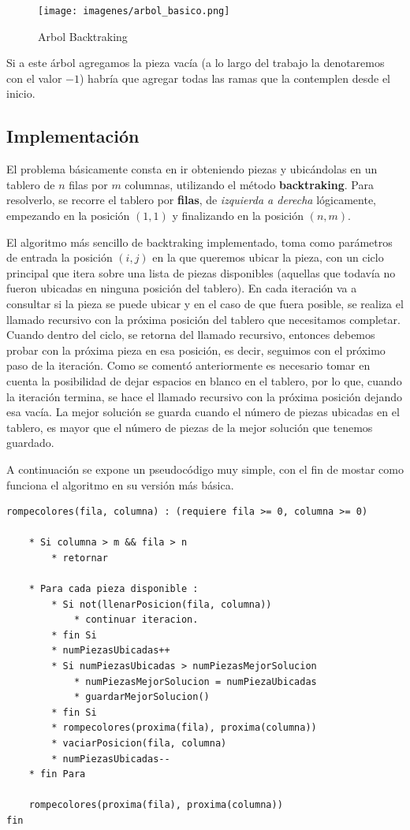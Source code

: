 \documentclass[11pt,a4paper]{article}
\begin{document}
	\begin{figure}[H]
    	\begin{center}
        	\texttt{[image: imagenes/arbol\_basico.png]}
    	\end{center}
    	\caption{Arbol Backtraking}
    	\label{fig:arbol_basico}
	\end{figure}

Si a este árbol agregamos la pieza vacía (a lo largo del trabajo la denotaremos con el valor $-1$) habría que agregar todas las ramas que la contemplen desde el inicio.

\subsection*{Implementación}

El problema básicamente consta en ir obteniendo piezas y ubicándolas en un tablero de $n$ filas por $m$ columnas, utilizando el método \textbf{backtraking}.
Para resolverlo, se recorre el tablero por \textbf{filas}, de \textit{izquierda a derecha} lógicamente, empezando en la posición $(1,1)$ y finalizando en la posición $(n,m)$.

El algoritmo más sencillo de backtraking implementado, toma como parámetros de entrada la posición $(i,j)$ en la que queremos ubicar la pieza, con un ciclo principal que itera sobre una lista de piezas disponibles (aquellas que todavía no fueron ubicadas en ninguna posición del tablero). En cada iteración va a consultar si la pieza se puede ubicar y en el caso de que fuera posible, se realiza el llamado recursivo con la próxima posición del tablero que necesitamos completar. Cuando dentro del ciclo, se retorna del llamado recursivo, entonces debemos probar con la próxima pieza en esa posición, es decir, seguimos con el próximo paso de la iteración.
Como se comentó anteriormente es necesario tomar en cuenta la posibilidad de dejar espacios en blanco en el tablero, por lo que, cuando la iteración termina, se hace el llamado recursivo con la próxima posición dejando esa vacía.
La mejor solución se guarda cuando el número de piezas ubicadas en el tablero, es mayor que el número de piezas de la mejor solución que tenemos guardado.

A continuación se expone un pseudocódigo muy simple, con el fin de mostar como funciona el algoritmo en su versión más básica.

\begin{Verbatim}[commandchars=\\\{\}]
rompecolores(fila, columna) : (requiere fila >= 0, columna >= 0)

	* Si columna > m && fila > n
		* retornar
	
	* Para cada pieza disponible :
		* Si not(llenarPosicion(fila, columna))
			* continuar iteracion.
		* fin Si
		* numPiezasUbicadas++
		* Si numPiezasUbicadas > numPiezasMejorSolucion
			* numPiezasMejorSolucion = numPiezaUbicadas
			* guardarMejorSolucion()
		* fin Si
		* rompecolores(proxima(fila), proxima(columna))
		* vaciarPosicion(fila, columna)
		* numPiezasUbicadas--
	* fin Para
	
	rompecolores(proxima(fila), proxima(columna))
fin
\end{Verbatim}
\end{document}
